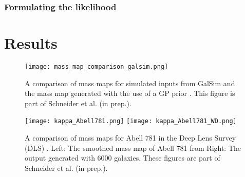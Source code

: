 \subsubsection{Formulating the likelihood}




\section{Results}
 \begin{figure}
	\centering
	\texttt{[image: mass\_map\_comparison\_galsim.png]}
	\caption{A comparison of mass maps for simulated inputs from {\sc GalSim} and
	the mass map generated with the use of a GP prior \label{fig:Galsim_massmaps}. 
	This figure is part of Schneider et al. (in prep.).
}
\end{figure}

\begin{figure}
	\centering
	\texttt{[image: kappa\_Abell781.png]}
	\texttt{[image: kappa\_Abell781\_WD.png]}
	\caption{A comparison of mass maps for Abell 781 in the Deep Lens Survey (DLS) 
		\label{fig:Abell781_massmap}.  Left: The smoothed mass map of Abell 781 from 
		Right: The output generated with 6000
		galaxies. 
	These figures are part of Schneider et al. (in prep.).
}
\end{figure}




